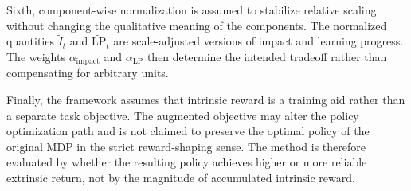 Sixth, component-wise normalization is assumed to stabilize relative scaling without changing the qualitative meaning of the components.
The normalized quantities $\widetilde{I}_t$ and $\widetilde{\mathrm{LP}}_t$ are scale-adjusted versions of impact and learning progress.
The weights $\alpha_{\mathrm{impact}}$ and $\alpha_{\mathrm{LP}}$ then determine the intended tradeoff rather than compensating for arbitrary units.

Finally, the framework assumes that intrinsic reward is a training aid rather than a separate task objective.
The augmented objective may alter the policy optimization path and is not claimed to preserve the optimal policy of the original MDP in the strict reward-shaping sense.
The method is therefore evaluated by whether the resulting policy achieves higher or more reliable extrinsic return, not by the magnitude of accumulated intrinsic reward.